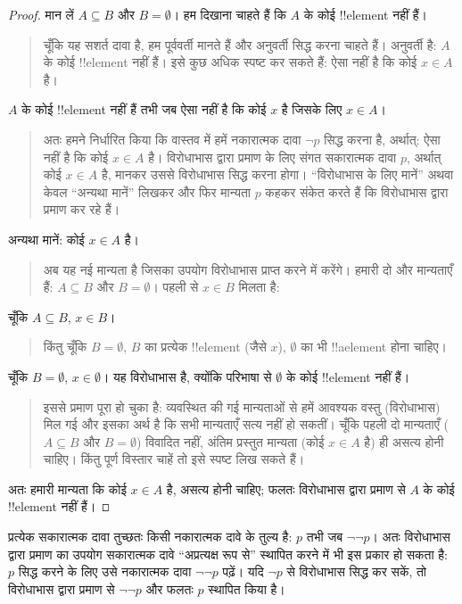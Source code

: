 \documentclass[../../../include/open-logic-section]{subfiles}
\begin{document}
\begin{proof}
  मान लें $A\subseteq B$ और $B=\emptyset$। हम दिखाना चाहते हैं कि $A$ के
  कोई !!{element} नहीं हैं।
  \begin{quote}
    चूँकि यह सशर्त दावा है, हम पूर्ववर्ती मानते हैं और अनुवर्ती सिद्ध करना
    चाहते हैं। अनुवर्ती है: $A$ के कोई !!{element} नहीं हैं। इसे कुछ अधिक
    स्पष्ट कर सकते हैं: ऐसा नहीं है कि कोई $x\in A$ है।
  \end{quote}
  $A$ के कोई !!{element} नहीं हैं तभी जब ऐसा नहीं है कि कोई $x$ है जिसके
  लिए $x\in A$।
  \begin{quote}
    अतः हमने निर्धारित किया कि वास्तव में हमें नकारात्मक दावा $\lnot p$
    सिद्ध करना है, अर्थात्: ऐसा नहीं है कि कोई $x\in A$ है। विरोधाभास द्वारा
    प्रमाण के लिए संगत सकारात्मक दावा $p$, अर्थात् कोई $x\in A$ है, मानकर
    उससे विरोधाभास सिद्ध करना होगा। ``विरोधाभास के लिए मानें'' अथवा केवल
    ``अन्यथा मानें'' लिखकर और फिर मान्यता $p$ कहकर संकेत करते हैं कि
    विरोधाभास द्वारा प्रमाण कर रहे हैं।
  \end{quote}
  अन्यथा मानें: कोई $x\in A$ है।
  \begin{quote}
    अब यह नई मान्यता है जिसका उपयोग विरोधाभास प्राप्त करने में करेंगे।
    हमारी दो और मान्यताएँ हैं: $A\subseteq B$ और $B=\emptyset$। पहली से
    $x\in B$ मिलता है:
  \end{quote}
  चूँकि $A\subseteq B$, $x\in B$।
  \begin{quote}
    किंतु चूँकि $B=\emptyset$, $B$ का प्रत्येक !!{element} (जैसे $x$),
    $\emptyset$ का भी !!a{element} होना चाहिए।
  \end{quote}
  चूँकि $B=\emptyset$, $x\in\emptyset$। यह विरोधाभास है, क्योंकि परिभाषा
  से $\emptyset$ के कोई !!{element} नहीं हैं।
  \begin{quote}
    इससे प्रमाण पूरा हो चुका है: व्यवस्थित की गई मान्यताओं से हमें आवश्यक
    वस्तु (विरोधाभास) मिल गई और इसका अर्थ है कि सभी मान्यताएँ सत्य नहीं हो
    सकतीं। चूँकि पहली दो मान्यताएँ ($A\subseteq B$ और $B=\emptyset$)
    विवादित नहीं, अंतिम प्रस्तुत मान्यता (कोई $x\in A$ है) ही असत्य होनी
    चाहिए। किंतु पूर्ण विस्तार चाहें तो इसे स्पष्ट लिख सकते हैं।
  \end{quote}
  अतः हमारी मान्यता कि कोई $x\in A$ है, असत्य होनी चाहिए; फलतः विरोधाभास
  द्वारा प्रमाण से $A$ के कोई !!{element} नहीं हैं।
\end{proof}

प्रत्येक सकारात्मक दावा तुच्छतः किसी नकारात्मक दावे के तुल्य है: $p$ तभी
जब $\lnot\lnot p$। अतः विरोधाभास द्वारा प्रमाण का उपयोग सकारात्मक दावे
``अप्रत्यक्ष रूप से'' स्थापित करने में भी इस प्रकार हो सकता है: $p$ सिद्ध
करने के लिए उसे नकारात्मक दावा $\lnot\lnot p$ पढ़ें। यदि $\lnot p$ से
विरोधाभास सिद्ध कर सकें, तो विरोधाभास द्वारा प्रमाण से $\lnot\lnot p$ और
फलतः $p$ स्थापित किया है।
\end{document}
